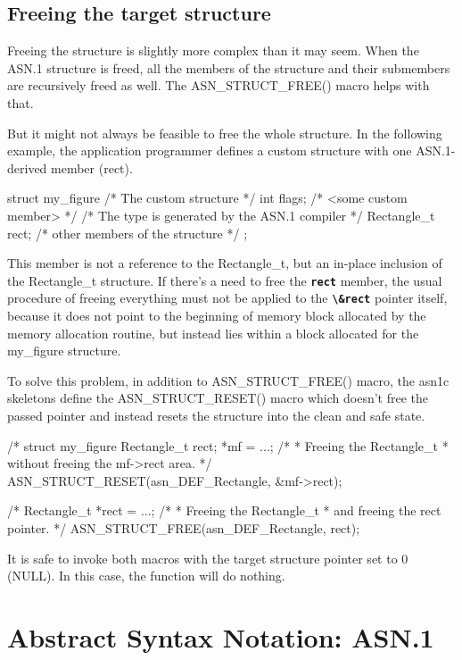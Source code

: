 \documentclass[english,oneside,12pt]{book}
\newcommand{\code}[1]{\texttt{\textbf{\lstinline{#1}}}}
\begin{document}
\section{\label{sec:Freeing-the-target}Freeing the target structure}

Freeing the structure is slightly more complex than it may seem.
When the ASN.1 structure is freed, all the members of the structure
and their submembers are recursively freed as well.
The ASN\_STRUCT\_FREE() macro helps with that.

But it might not always be feasible to free the whole structure.
In the following example, the application programmer defines a custom
structure with one ASN.1-derived member (rect).
\begin{codesample}
struct my_figure {       /* The custom structure */
    int flags;           /* <some custom member> */
    /* The type is generated by the ASN.1 compiler */
    Rectangle_t rect;
    /* other members of the structure */
};
\end{codesample}
This member is not a reference to the Rectangle\_t, but an in-place inclusion
of the Rectangle\_t structure.
If there's a need to free the \code{rect} member, the usual procedure of
freeing everything must not be applied to the \code{\&rect} pointer itself,
because it does not point to the beginning of memory block allocated by
the memory allocation routine, but instead lies within a block allocated for
the my\_figure structure.

To solve this problem, in addition to ASN\_STRUCT\_FREE() macro, the asn1c
skeletons define the ASN\_STRUCT\_RESET() macro which doesn't free the passed
pointer and instead resets the structure into the clean and safe state.
\begin{codesample}
/* %
struct my_figure {
    Rectangle_t rect;
} *mf = ...;
/*
 * Freeing the Rectangle_t
 * without freeing the mf->rect area.
 */
ASN_STRUCT_RESET(asn_DEF_Rectangle, &mf->rect);
  
/* %
Rectangle_t *rect = ...;
/*
 * Freeing the Rectangle_t
 * and freeing the rect pointer.
 */
ASN_STRUCT_FREE(asn_DEF_Rectangle, rect);
\end{codesample}
It is safe to invoke both macros with the target structure pointer
set to 0 (NULL). In this case, the function will do nothing.

\chapter{\label{chap:Abstract-Syntax-Notation}Abstract Syntax Notation: ASN.1}
\end{document}
